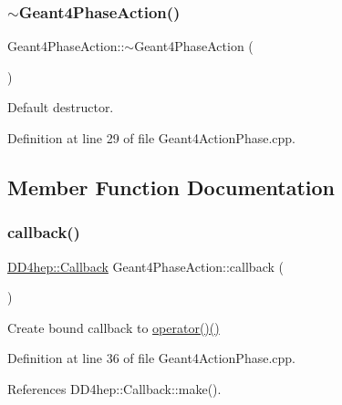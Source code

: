 \subsubsection{\texorpdfstring{$\sim$\+Geant4\+Phase\+Action()}{~Geant4PhaseAction()}}
{\footnotesize\ttfamily Geant4\+Phase\+Action\+::$\sim$\+Geant4\+Phase\+Action (\begin{DoxyParamCaption}{ }\end{DoxyParamCaption})\hspace{0.3cm}{\ttfamily [virtual]}}



Default destructor. 



Definition at line 29 of file Geant4\+Action\+Phase.\+cpp.



\subsection{Member Function Documentation}
\hypertarget{class_d_d4hep_1_1_simulation_1_1_geant4_phase_action_a2ec5c793439611a45e83c2fffd5093d2}{}\label{class_d_d4hep_1_1_simulation_1_1_geant4_phase_action_a2ec5c793439611a45e83c2fffd5093d2} 
\subsubsection{\texorpdfstring{callback()}{callback()}}
{\footnotesize\ttfamily \hyperlink{class_d_d4hep_1_1_callback}{D\+D4hep\+::\+Callback} Geant4\+Phase\+Action\+::callback (\begin{DoxyParamCaption}{ }\end{DoxyParamCaption})\hspace{0.3cm}{\ttfamily [virtual]}}



Create bound callback to \hyperlink{class_d_d4hep_1_1_simulation_1_1_geant4_phase_action_a5d8bac662ec707a8cdff0bd3cdd9b831}{operator()()} 



Definition at line 36 of file Geant4\+Action\+Phase.\+cpp.



References D\+D4hep\+::\+Callback\+::make().




